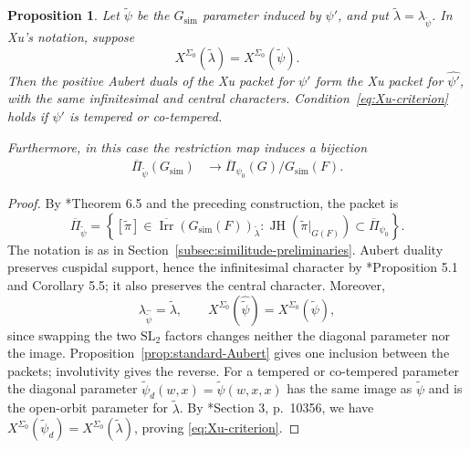 \documentclass[12pt]{amsart}
\theoremstyle{definition}
\theoremstyle{plain}
\newtheorem{proposition}[definition]{Proposition}
\theoremstyle{remark}
\def\SL{\mathrm{SL}}
\numberwithin{equation}{section}
\begin{document}
\begin{proposition}\label{prop:Xu-Aubert}
Let $\widetilde\psi$ be the $G_{\mathrm{sim}}$ parameter induced by $\psi'$,
and put $\widetilde\lambda=\lambda_{\widetilde\psi}$. In Xu's notation,
suppose
\begin{equation}\label{eq:Xu-criterion}
 X^{\Sigma_0}(\widetilde\lambda)
       =X^{\Sigma_0}(\widetilde\psi).
\end{equation}
Then the positive Aubert duals of the Xu packet for $\psi'$ form the
Xu packet for $\widehat{\psi'}$, with the same infinitesimal and central
characters. 
Condition~\eqref{eq:Xu-criterion} holds if $\psi'$ is
tempered or co-tempered.

Furthermore, in this case the restriction map induces a bijection
\begin{align*}
      \overline{\Pi}_{\widetilde{\psi}}(G_{\mathrm{sim}}) &\longrightarrow \overline{\Pi}_{\psi_0}(G)/G_{\mathrm{sim}}(F).
\end{align*}
\end{proposition}

\begin{proof}
By \cite{Xu2024-ArthurPacketsQuasisplitGSp2nGO2n}*{Theorem 6.5
and the preceding construction}, the packet is
\[
 \overline\Pi_{\widetilde\psi}
 =\left\{[\widetilde\pi]\in
       \overline{\operatorname{Irr}}(G_{\mathrm{sim}}(F))_{\widetilde\lambda}:
       \operatorname{JH}(\widetilde\pi|_{G(F)})
                         \subset\overline\Pi_{\psi_0}\right\}.
\]
The notation is as in Section~\ref{subsec:similitude-preliminaries}.
Aubert duality preserves cuspidal support, hence the infinitesimal
character by
\cite{Xu2024-ArthurPacketsQuasisplitGSp2nGO2n}*{Proposition 5.1 and Corollary 5.5};
it also preserves
the central character. Moreover,
\[
 \lambda_{\widehat{\widetilde\psi}}=\widetilde\lambda,
 \qquad
 X^{\Sigma_0}(\widehat{\widetilde\psi})
       =X^{\Sigma_0}(\widetilde\psi),
\]
since swapping the two $\SL_2$ factors changes neither the diagonal
parameter nor the image. Proposition~\ref{prop:standard-Aubert} gives
one inclusion between the packets; involutivity gives the reverse.
For a tempered or co-tempered parameter the diagonal parameter
$\widetilde\psi_d(w,x)=\widetilde\psi(w,x,x)$ has the same image as
$\widetilde\psi$ and is the open-orbit parameter for
$\widetilde\lambda$. By
\cite{Xu2024-ArthurPacketsQuasisplitGSp2nGO2n}*{Section 3, p.~10356},
we have
$X^{\Sigma_0}(\widetilde\psi_d)=X^{\Sigma_0}(\widetilde\lambda)$,
proving \eqref{eq:Xu-criterion}.
\end{proof}
\end{document}
